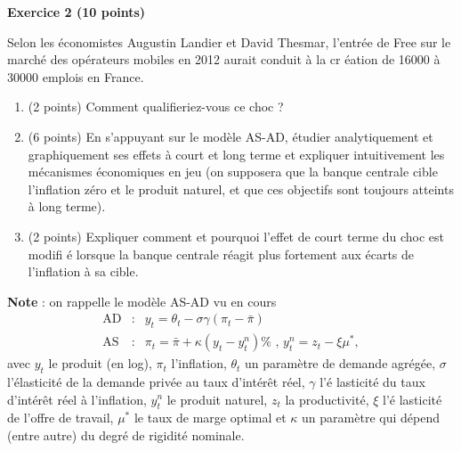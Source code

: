 \documentclass{article}
\begin{document}
\bigskip

\textbf{Exercice 2 (10 points)}



\bigskip

Selon les \'{e}conomistes Augustin Landier et David Thesmar, l'entr\'{e}e de
Free sur le march\'{e} des op\'{e}rateurs mobiles en 2012 aurait conduit \`{a} la cr%
\'{e}ation de 16000 \`{a} 30000 emplois en France.

\begin{enumerate}
    \item (2 points) Comment qualifieriez-vous ce choc ?

    \item (6 points) En s'appuyant sur le mod\`{e}le AS-AD, \'{e}tudier analytiquement et
graphiquement ses effets à court et long terme et expliquer intuitivement
les m\'{e}canismes \'{e}conomiques en jeu (on supposera que la banque
centrale cible l'inflation z\'{e}ro et le produit naturel, et que ces
objectifs sont toujours atteints \`{a} long terme). 

    \item  (2 points) Expliquer comment et pourquoi l'effet de court terme du choc est modifi%
\'{e} lorsque la banque centrale r\'{e}agit plus fortement aux \'{e}carts de
l'inflation \`{a} sa cible.
\end{enumerate}

\begin{center}
\bigskip
\end{center}

\textbf{Note} : on rappelle le mod\`{e}le AS-AD vu en cours
\begin{eqnarray*}
\text{AD} &:&y_{t}=\theta _{t}-\sigma \gamma \left( \pi _{t}-\bar{\pi}%
\right)  \\
\text{AS} &:&\pi _{t}=\bar{\pi}+\kappa \left( y_{t}-y_{t}^{n}\right) \text{%
, }y_{t}^{n}=z_{t}-\xi \mu ^{\ast },
\end{eqnarray*}%
avec $y_{t}$ le produit (en log), $\pi _{t}$ l'inflation, $\theta _{t}$ un
param\`{e}tre de demande agr\'{e}g\'{e}e, $\sigma $ l'\'{e}lasticit\'{e} de
la demande priv\'{e}e au taux d'int\'{e}r\^{e}t r\'{e}el, $\gamma $ l'\'{e}%
lasticit\'{e} du taux d'int\'{e}r\^{e}t r\'{e}el \`{a} l'inflation, $%
y_{t}^{n}$ le produit naturel, $z_{t}$ la productivit\'{e}, $\xi $ l'\'{e}%
lasticit\'{e} de l'offre de travail, $\mu ^{\ast }$ le taux de marge optimal
et $\kappa $ un param\`{e}tre qui d\'{e}pend (entre autre) du degr\'{e} de
rigidit\'{e} nominale.
\end{document}
